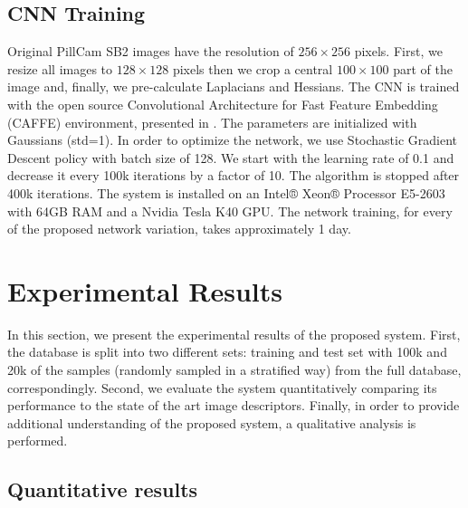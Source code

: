 \documentclass[review,12pt,3p]{elsarticle}
\begin{document}
\subsection{CNN Training}
Original PillCam SB2 images have the resolution of $256 \times 256$ pixels. First, we resize all images to $128 \times 128$ pixels then we crop a central $100 \times 100$ part of the image and, finally, we pre-calculate Laplacians and Hessians. The CNN is trained with the open source Convolutional Architecture for Fast Feature Embedding  (CAFFE) environment, presented in \cite{Jia13caffe}. The parameters are initialized with Gaussians (std=1). In order to optimize the network, we use Stochastic Gradient Descent policy with batch size of 128. We start with the learning rate of 0.1 and decrease it every 100k iterations by a factor of 10. The algorithm is stopped after 400k iterations. The system is installed on an Intel® Xeon® Processor E5-2603 with 64GB RAM and a Nvidia Tesla K40 GPU. The network training, for every of the proposed network variation, takes approximately 1 day.

\section{Experimental Results}
\label{secResults}

In this section, we present the experimental results of the proposed system. First, the database is split into two different sets: training and test set with 100k and 20k of the samples (randomly sampled in a stratified way) from the full database, correspondingly. Second, we evaluate the system quantitatively comparing its performance to the state of the art image descriptors. Finally, in order to provide additional understanding of the proposed system, a qualitative analysis is performed.

\subsection{Quantitative results}
\end{document}

